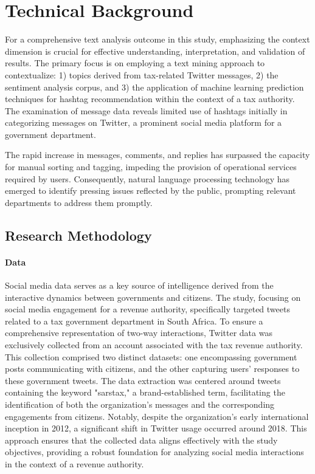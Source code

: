 




\chapter{Technical Background}
\label{chap:second tech_background}

For a comprehensive text analysis outcome in this study, emphasizing the context dimension is crucial for effective understanding, interpretation, and validation of results. The primary focus is on employing a text mining approach to contextualize: 1) topics derived from tax-related Twitter messages, 2) the sentiment analysis corpus, and 3) the application of machine learning prediction techniques for hashtag recommendation within the context of a tax authority. The examination of message data reveals limited use of hashtags initially in categorizing messages on Twitter, a prominent social media platform for a government department.

The rapid increase in messages, comments, and replies has surpassed the capacity for manual sorting and tagging, impeding the provision of operational services required by users. Consequently, natural language processing technology has emerged to identify pressing issues reflected by the public, prompting relevant departments to address them promptly.

\section{Research Methodology}
\label{sec:second:research_methodology}

\subsubsection{Data}

Social media data serves as a key source of intelligence derived from the interactive dynamics between governments and citizens. The study, focusing on social media engagement for a revenue authority, specifically targeted tweets related to a tax government department in South Africa. To ensure a comprehensive representation of two-way interactions, Twitter data was exclusively collected from an account associated with the tax revenue authority. This collection comprised two distinct datasets: one encompassing government posts communicating with citizens, and the other capturing users' responses to these government tweets. The data extraction was centered around tweets containing the keyword "sarstax," a brand-established term, facilitating the identification of both the organization's messages and the corresponding engagements from citizens. Notably, despite the organization's early international inception in 2012, a significant shift in Twitter usage occurred around 2018. This approach ensures that the collected data aligns effectively with the study objectives, providing a robust foundation for analyzing social media interactions in the context of a revenue authority.

